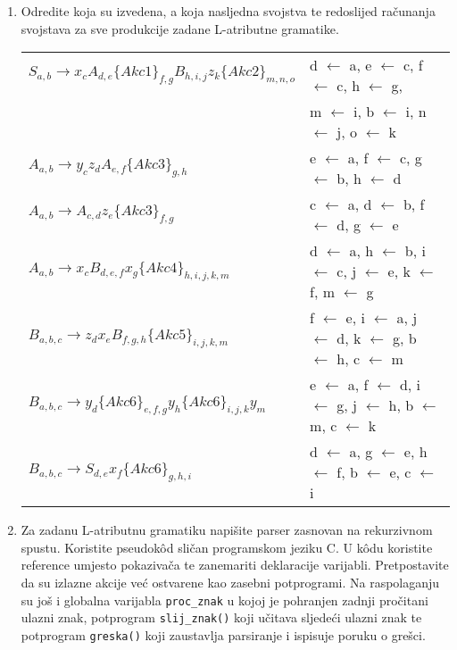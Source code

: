 \documentclass[times, 12pt, utf8]{book}
\begin{document}
\begin{enumerate}[resume]
\item
Odredite koja su izvedena, a koja nasljedna svojstva te redoslijed računanja svojstava za sve produkcije zadane L-atributne gramatike. \cite[str.~173-181]{udzbenik}

\begin{tabular}{ ll } 

\( S_{a,b} \to x_{c} A_{d,e} \{Akc1\}_{f,g} B_{h,i,j} z_{k} \{Akc2\}_{m,n,o} \) & d \(\leftarrow\) a, e \(\leftarrow\) c, f \(\leftarrow\) c, h \(\leftarrow\) g, \\ & m \(\leftarrow\) i, b \(\leftarrow\) i, n \(\leftarrow\) j, o \(\leftarrow\) k \\
\( A_{a,b} \to y_{c} z_{d} A_{e,f} \{Akc3\}_{g,h} \) & e \(\leftarrow\) a, f \(\leftarrow\) c, g \(\leftarrow\) b, h \(\leftarrow\) d \\
\( A_{a,b} \to A_{c,d} z_{e} \{Akc3\}_{f,g} \) & c \(\leftarrow\) a, d \(\leftarrow\) b, f \(\leftarrow\) d, g \(\leftarrow\) e \\
\( A_{a,b} \to x_{c} B_{d,e,f} x_{g} \{Akc4\}_{h,i,j,k,m} \) & d \(\leftarrow\) a, h \(\leftarrow\) b, i \(\leftarrow\) c, j \(\leftarrow\) e, k \(\leftarrow\) f, m \(\leftarrow\) g \\
\( B_{a,b,c} \to z_{d} x_{e} B_{f,g,h} \{Akc5\}_{i,j,k,m} \) & f \(\leftarrow\) e, i \(\leftarrow\) a, j \(\leftarrow\) d, k \(\leftarrow\) g, b \(\leftarrow\) h, c \(\leftarrow\) m \\
\( B_{a,b,c} \to y_{d} \{Akc6\}_{e,f,g} y_{h} \{Akc6\}_{i,j,k} y_{m} \) & e \(\leftarrow\) a, f \(\leftarrow\) d, i \(\leftarrow\) g, j \(\leftarrow\) h, b \(\leftarrow\) m, c \(\leftarrow\) k \\
\( B_{a,b,c} \to S_{d,e} x_{f} \{Akc6\}_{g,h,i} \) & d \(\leftarrow\) a, g \(\leftarrow\) e, h \(\leftarrow\) f, b \(\leftarrow\) e, c \(\leftarrow\) i \\
\end{tabular} 

\item
Za zadanu L-atributnu gramatiku napišite parser zasnovan na rekurzivnom spustu.
Koristite pseudokôd sličan programskom jeziku C.
U kôdu koristite reference umjesto pokazivača te zanemariti deklaracije varijabli.
Pretpostavite da su izlazne akcije već ostvarene kao zasebni potprogrami.
Na raspolaganju su još i globalna varijabla \texttt{proc\_znak} u kojoj je pohranjen zadnji pročitani ulazni znak, potprogram \texttt{slij\_znak()} koji učitava sljedeći ulazni znak te potprogram \texttt{greska()} koji zaustavlja parsiranje i ispisuje poruku o grešci. \cite[str.~195-198]{udzbenik}


\end{enumerate}
\end{document}
